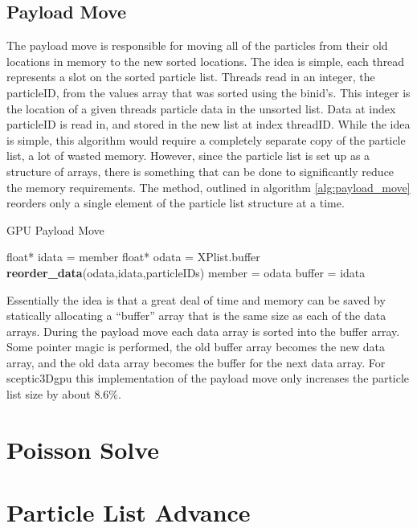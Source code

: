 		\subsection{Payload Move}
		The payload move is responsible for moving all of the particles from their old locations in memory to the new sorted locations. The idea is simple, each thread represents a slot on the sorted particle list. Threads read in an integer, the particleID, from the values array that was sorted using the binid's. This integer is the location of a given threads particle data in the unsorted list. Data at index particleID is read in, and stored in the new list at index threadID. While the idea is simple, this algorithm would require a completely separate copy of the particle list, a lot of wasted memory. However, since the particle list is set up as a structure of arrays, there is something that can be done to significantly reduce the memory requirements. The method, outlined in algorithm \ref{alg:payload_move} reorders only a single element of the particle list structure at a time. 

\begin{algorithm}
	\caption{GPU Payload Move}
	\label{alg:payload_move}
	\begin{algorithmic}
		\STATE float* idata = member
		\STATE float* odata = XPlist.buffer
		\STATE \textbf{reorder\_data}(odata,idata,particleIDs)
		\STATE member = odata
		\STATE buffer = idata
		\ENDFOR
	\end{algorithmic}
\end{algorithm}
  		
		Essentially the idea is that a great deal of time and memory can be saved by statically allocating a ``buffer'' array that is the same size as each of the data arrays. During the payload move each data array is sorted into the buffer array. Some pointer magic is performed, the old buffer array becomes the new data array, and the old data array becomes the buffer for the next data array. For sceptic3Dgpu this implementation of the payload move only increases the particle list size by about 8.6\%.



	\section{Poisson Solve}

	\section{Particle List Advance}
	

